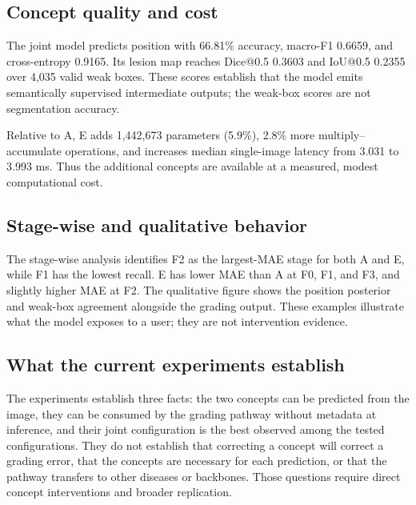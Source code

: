 \subsection{Concept quality and cost}
The joint model predicts position with 66.81\% accuracy, macro-F1 0.6659, and cross-entropy 0.9165. Its lesion map reaches Dice@0.5 0.3603 and IoU@0.5 0.2355 over 4,035 valid weak boxes. These scores establish that the model emits semantically supervised intermediate outputs; the weak-box scores are not segmentation accuracy.

Relative to A, E adds 1,442,673 parameters (5.9\%), 2.8\% more multiply--accumulate operations, and increases median single-image latency from 3.031 to 3.993 ms. Thus the additional concepts are available at a measured, modest computational cost.

\subsection{Stage-wise and qualitative behavior}
The stage-wise analysis identifies F2 as the largest-MAE stage for both A and E, while F1 has the lowest recall. E has lower MAE than A at F0, F1, and F3, and slightly higher MAE at F2. The qualitative figure shows the position posterior and weak-box agreement alongside the grading output. These examples illustrate what the model exposes to a user; they are not intervention evidence.

\subsection{What the current experiments establish}
The experiments establish three facts: the two concepts can be predicted from the image, they can be consumed by the grading pathway without metadata at inference, and their joint configuration is the best observed among the tested configurations. They do not establish that correcting a concept will correct a grading error, that the concepts are necessary for each prediction, or that the pathway transfers to other diseases or backbones. Those questions require direct concept interventions and broader replication.
